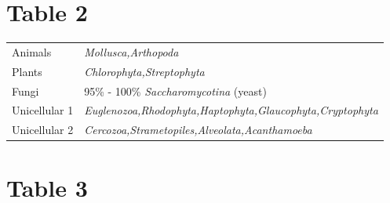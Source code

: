 \documentclass[a4paper]{article}
\begin{document}
\newpage
\section*{Table 2} 

\begin{tabular}{ll}
\hline
Animals&\textit{Mollusca,Arthopoda}\\
Plants&\textit{Chlorophyta,Streptophyta}\\
Fungi&95\% - 100\% \textit{Saccharomycotina} (yeast)\\
Unicellular 1&\textit{Euglenozoa,Rhodophyta,Haptophyta,Glaucophyta,Cryptophyta}\\
Unicellular 2&\textit{Cercozoa,Strametopiles,Alveolata,Acanthamoeba}\\
\hline
\end{tabular}


\newpage
\section*{Table 3} 


\vskip 5pt
\end{document}
